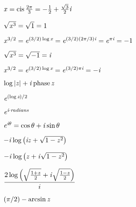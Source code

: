 {\newpage
\clearpage
\samepage \( {\it x}=\mathop{\rm cis}\nolimits {2 \pi \over 3}= -{1 \over 2} + {\sqrt{3} \over 2}{\it i} \)
}

{\newpage
\clearpage
\samepage \( \sqrt{{\it x}^3} = \sqrt{1} = 1 \)
}

{\newpage
\clearpage
\samepage \( {\it x}^{3 / 2} = {\it e}^{(3/2) \log {\hbox{\scriptsize\it x}}}
   = {\it e}^{(3/2) (2\pi/3) \hbox{\scriptsize\it i}} = {\it e}^{\pi \hbox{\scriptsize\it i}} = -1 \)
}

{\newpage
\clearpage
\samepage \( \sqrt{{\it x}^3} = \sqrt{-1} = {\it i} \)
}

{\newpage
\clearpage
\samepage \( {\it x}^{3/2} = {\it e}^{(3 / 2) \log {\hbox{\scriptsize\it x}}}
   = {\it e}^{(3/2) \pi \hbox{\scriptsize\it \hbox{\scriptsize\it i}}} = -{\it i} \)
}

{\newpage
\clearpage
\samepage \( \log \left| {\it z} \right| + {\it i} \mathop{\rm phase}\nolimits {\it z} \)
}

{\newpage
\clearpage
\samepage \( {\it e}^{(\log \hbox{\scriptsize\it z})/2} \)
}

{\newpage
\clearpage
\samepage \( {\it e} ^ {\hbox{\scriptsize\it i} \cdot \hbox{\scriptsize\it radians}} \)
}

{\newpage
\clearpage
\samepage %
\( {\it e} ^{ \hbox{\scriptsize\it i} \theta } = \cos \theta + {\it i} \sin \theta \)
}

{\newpage
\clearpage
\samepage \( -{\it i} \log \left({\it i}{\it z} + \sqrt{1-{\it z}^2}\right) \)
}

{\newpage
\clearpage
\samepage \( -{\it i} \log \left({\it z} + {\it i}\sqrt{1-{\it z}^2}\right) \)
}

{\newpage
\clearpage
\samepage \(  \displaystyle { 2 \log \left( \sqrt{{1+{\it z} \over 2}} + {\it i} \sqrt{{1-{\it z} \over 2}} \right) \over i}\)
}

{\newpage
\clearpage
\samepage \( (\pi/2)-\arcsin {\it z} \)
}

